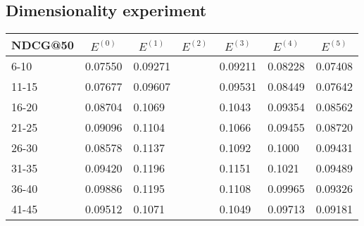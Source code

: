 \subsection{Dimensionality experiment}

\begin{table*}[]
    \begin{tabular}{|l|l|l|l|l|l|l|}
    \hline
    NDCG@50 & \multicolumn{1}{c|}{$E^{(0)}$} & \multicolumn{1}{c|}{$E^{(1)}$} & \multicolumn{1}{c|}{$E^{(2)}$} & \multicolumn{1}{c|}{$E^{(3)}$} & \multicolumn{1}{c|}{$E^{(4)}$} & \multicolumn{1}{c|}{$E^{(5)}$} \\ \hline
    6-10    & 0.07550                        & 0.09271                        &                                & 0.09211                        & 0.08228                        & 0.07408                        \\ \hline
    11-15   & 0.07677                        & 0.09607                        &                                & 0.09531                        & 0.08449                        & 0.07642                        \\ \hline
    16-20   & 0.08704                        & 0.1069                         &                                & 0.1043                         & 0.09354                        & 0.08562                        \\ \hline
    21-25   & 0.09096                        & 0.1104                         &                                & 0.1066                         & 0.09455                        & 0.08720                        \\ \hline
    26-30   & 0.08578                        & 0.1137                         &                                & 0.1092                         & 0.1000                         & 0.09431                        \\ \hline
    31-35   & 0.09420                        & 0.1196                         &                                & 0.1151                         & 0.1021                         & 0.09489                        \\ \hline
    36-40   & 0.09886                        & 0.1195                         &                                & 0.1108                         & 0.09965                        & 0.09326                        \\ \hline
    41-45   & 0.09512                        & 0.1071                         &                                & 0.1049                         & 0.09713                        & 0.09181                        \\ \hline

\end{tabular}
\end{table*}
